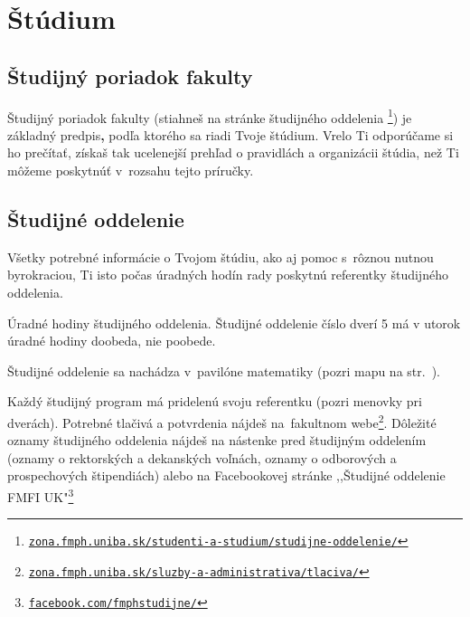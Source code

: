 \chapter{Štúdium}




\section{Študijný poriadok fakulty}

Študijný poriadok fakulty (stiahneš na stránke študijného oddelenia%
\footnote{\href{https://zona.fmph.uniba.sk/studenti-a-studium/studijne-oddelenie//}{\texttt{zona.fmph.uniba.sk/studenti-a-studium/studijne-oddelenie/}}%
}) je základný predpis\textbf{, }podľa ktorého sa riadi Tvoje štúdium.
Vrelo Ti odporúčame si ho prečítať, získaš tak ucelenejší prehľad
o pravidlách a organizácii štúdia, než Ti môžeme poskytnúť v~rozsahu
tejto príručky.


\section{Študijné oddelenie}

Všetky potrebné informácie o Tvojom štúdiu, ako aj pomoc s~rôznou
nutnou byrokraciou, Ti isto počas úradných hodín rady poskytnú referentky študijného oddelenia. 

\begin{table}[h!]
\begin{centering}

\par\end{centering}
\protect\caption{Úradné hodiny študijného oddelenia. Študijné oddelenie číslo dverí 5 má v utorok úradné hodiny doobeda, nie poobede.} %
\label{tab:SO-UH}
\end{table}

Študijné oddelenie sa nachádza v~pavilóne matematiky (pozri mapu
na str.\ \pageref{fig:mapa_fmfi}).

Každý študijný program má pridelenú svoju re\-fe\-ren\-tku (pozri
menovky pri dverách). Potrebné tlačivá a potvrdenia nájdeš na~fakultnom
webe\footnote{\href{https://zona.fmph.uniba.sk/sluzby-a-administrativa/tlaciva/}{\texttt{zona.fmph.uniba.sk/sluzby-a-administrativa/tlaciva/}}}. Dôležité oznamy študijného oddelenia nájdeš na nástenke pred študijným oddelením (oznamy o rektorských a dekanských voľnách, oznamy o odborových a prospechových štipendiách) alebo na Facebookovej stránke ,,Študijné oddelenie FMFI UK"\footnote{\href{www.facebook.com/fmphstudijne/}{\texttt{facebook.com/fmphstudijne/}}} \\

